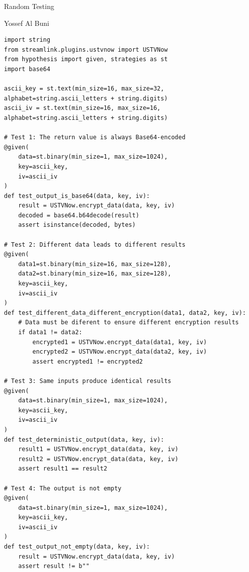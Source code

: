 \documentclass[a4paper]{scrreprt}
\newcounter{question}
\begin{document}
\begin{question}{Random Testing}
\begin{enumerate}[topsep=0pt, leftmargin=*]


Yossef Al Buni
\begin{lstlisting}[caption={Yossef Al Buni -- Tests in test\_encrypt\_data\_4}, label={lst:encryption}]
import string
from streamlink.plugins.ustvnow import USTVNow
from hypothesis import given, strategies as st
import base64

ascii_key = st.text(min_size=16, max_size=32, alphabet=string.ascii_letters + string.digits)
ascii_iv = st.text(min_size=16, max_size=16, alphabet=string.ascii_letters + string.digits)

# Test 1: The return value is always Base64-encoded
@given(
    data=st.binary(min_size=1, max_size=1024),
    key=ascii_key,
    iv=ascii_iv
)
def test_output_is_base64(data, key, iv):
    result = USTVNow.encrypt_data(data, key, iv)
    decoded = base64.b64decode(result)
    assert isinstance(decoded, bytes)

# Test 2: Different data leads to different results
@given(
    data1=st.binary(min_size=16, max_size=128),
    data2=st.binary(min_size=16, max_size=128),
    key=ascii_key,
    iv=ascii_iv
)
def test_different_data_different_encryption(data1, data2, key, iv):
    # Data must be diferent to ensure different encryption results
    if data1 != data2:
        encrypted1 = USTVNow.encrypt_data(data1, key, iv)
        encrypted2 = USTVNow.encrypt_data(data2, key, iv)
        assert encrypted1 != encrypted2

# Test 3: Same inputs produce identical results
@given(
    data=st.binary(min_size=1, max_size=1024),
    key=ascii_key,
    iv=ascii_iv
)
def test_deterministic_output(data, key, iv):
    result1 = USTVNow.encrypt_data(data, key, iv)
    result2 = USTVNow.encrypt_data(data, key, iv)
    assert result1 == result2

# Test 4: The output is not empty
@given(
    data=st.binary(min_size=1, max_size=1024),
    key=ascii_key,
    iv=ascii_iv
)
def test_output_not_empty(data, key, iv):
    result = USTVNow.encrypt_data(data, key, iv)
    assert result != b""

    \end{lstlisting}





\end{enumerate}
\end{question}
\end{document}
